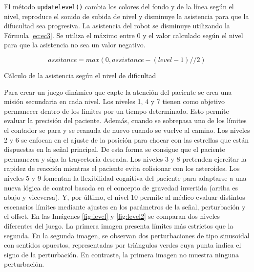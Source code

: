El método \verb|updatelevel()| cambia los colores del fondo y de la línea según el nivel, reproduce el sonido de subida de nivel y disminuye la asistencia para que la difucultad sea progresiva.
La asistencia del robot se disminuye utilizando la Fórmula \ref{ec:ec3}.
Se utiliza el máximo entre 0 y el valor calculado según el nivel para que la asistencia no sea un valor negativo.

\begin{myequation}[h]
\begin{equation}
assitance = max(0, assistance - (level - 1) // 2)
\nonumber
\label{ec:ec3}
\end{equation}
\caption[Cálculo de la asistencia según el nivel de dificultad]{Cálculo de la asistencia según el nivel de dificultad}
\end{myequation}

Para crear un juego dinámico que capte la atención del paciente se crea una misión secundaria en cada nivel.
Los niveles 1, 4 y 7 tienen como objetivo permanecer dentro de los límites por un tiempo determinado.
Esto permite evaluar la precisión del paciente.
Además, cuando se sobrepasa uno de los límites el contador se para y se reanuda de nuevo cuando se vuelve al camino.
Los niveles 2 y 6 se enfocan en el ajuste de la posición para chocar con las estrellas que están dispuestas en la señal principal.
De esta forma se consigue que el paciente permanezca y siga la trayectoria deseada.
Los niveles 3 y 8 pretenden ejercitar la rapidez de reacción mientras el paciente evita colisionar con los asteroides.
Los niveles 5 y 9 fomentan la flexibilidad cognitiva del paciente para adaptarse a una nueva lógica de control basada en el concepto de gravedad invertida (arriba es abajo y viceversa).
Y, por último, el nivel 10 permite al médico evaluar distintos escenarios límites mediante ajustes en los parámetros de la señal, perturbación y el offset.
En las Imágenes \ref{fig:level} y \ref{fig:level2} se comparan dos niveles diferentes del juego.
La primera imagen presenta límites más estrictos que la segunda.
En la segunda imagen, se observan dos perturbaciones de tipo sinusoidal con sentidos opuestos, representadas por triángulos verdes cuya punta indica el signo de la perturbación.
En contraste, la primera imagen no muestra ninguna perturbación.

